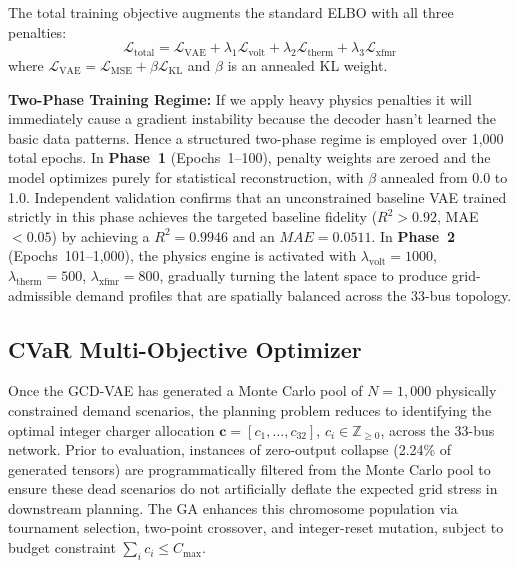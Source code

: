 \documentclass[conference]{IEEEtran}
\begin{document}
The total training objective augments the standard ELBO with all three penalties:
\begin{equation}
    \mathcal{L}_{\text{total}} = \mathcal{L}_{\text{VAE}} + \lambda_1\mathcal{L}_{\text{volt}} + \lambda_2\mathcal{L}_{\text{therm}} + \lambda_3\mathcal{L}_{\text{xfmr}}
\end{equation}
where $\mathcal{L}_{\text{VAE}} = \mathcal{L}_{\text{MSE}} + \beta\mathcal{L}_{\text{KL}}$ and $\beta$ is an annealed KL weight.

\textbf{Two-Phase Training Regime:} If we apply heavy physics penalties it will immediately cause a gradient instability because the decoder hasn't learned the basic data patterns. Hence a structured two-phase regime is employed over 1{,}000 total epochs. In \textbf{Phase~1} (Epochs~1--100), penalty weights are zeroed and the model optimizes purely for statistical reconstruction, with $\beta$ annealed from 0.0 to 1.0. 
Independent validation confirms that an unconstrained baseline VAE trained strictly in this phase achieves the targeted baseline fidelity ($R^2 > 0.92$, MAE $< 0.05$) by achieving a $R^2 = 0.9946$ and an $MAE = 0.0511$. 
In \textbf{Phase~2} (Epochs~101--1{,}000), the physics engine is activated with $\lambda_{\text{volt}} = 1000$, $\lambda_{\text{therm}} = 500$, $\lambda_{\text{xfmr}} = 800$, gradually turning the latent space to produce grid-admissible demand profiles that are spatially balanced across the 33-bus topology.

\subsection{CVaR Multi-Objective Optimizer}

Once the GCD-VAE has generated a Monte Carlo pool of $N = 1{,}000$ physically constrained demand scenarios, the planning problem reduces to identifying the optimal integer charger allocation $\mathbf{c} = [c_1, \ldots, c_{32}]$, $c_i \in \mathbb{Z}_{\geq 0}$, across the 33-bus network. 
Prior to evaluation, instances of zero-output collapse (2.24\% of generated tensors) are programmatically filtered from the Monte Carlo pool to ensure these dead scenarios do not artificially deflate the expected grid stress in downstream planning. 
The GA enhances this chromosome population via tournament selection, two-point crossover, and integer-reset mutation, subject to budget constraint $\sum_{i} c_i \leq C_{\max}$.
\end{document}
